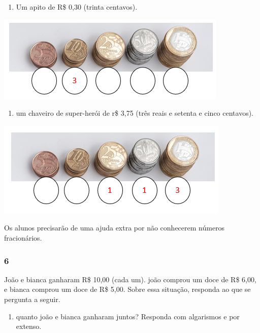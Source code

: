 \begin{enumerate}
\def\labelenumi{\Alph{enumi})}
\item
  Um apito de R\$ 0,30 (trinta centavos).
\end{enumerate}

\includegraphics[width=4.35477in,height=1.63565in]{media/image73.png}

\begin{enumerate}
\def\labelenumi{\Alph{enumi})}
\item
  um chaveiro de super-herói de r\$ 3,75 (três reais e setenta e cinco
  centavos).
\end{enumerate}

\includegraphics[width=4.39645in,height=1.81275in]{media/image74.png}

Os alunos precisarão de uma ajuda extra por não conhecerem números fracionários.

\subsubsection{6}\label{section-59}

João e bianca ganharam R\$ 10,00 (cada um). joão comprou um doce de R\$ 6,00,
e bianca comprou um doce de R\$ 5,00. Sobre essa situação, responda ao que se pergunta a seguir.

\begin{enumerate}
\def\labelenumi{\Alph{enumi})}
\item
  quanto joão e bianca ganharam juntos? Responda com algarismos e por extenso.
\end{enumerate}

